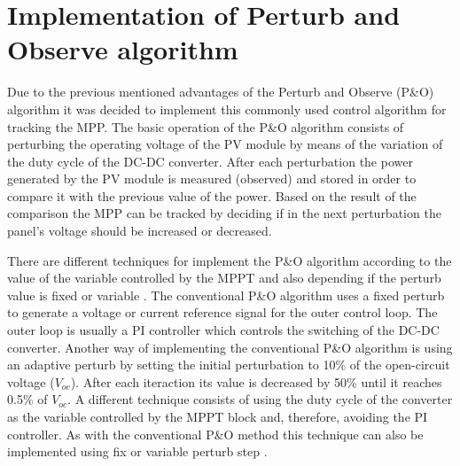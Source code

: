 \section{Implementation of Perturb and Observe algorithm}\label{MPPTImplementation}

Due to the previous mentioned advantages of the Perturb and Observe (P\&O) algorithm it was decided to implement this commonly used control algorithm for tracking the MPP. The basic operation of the P\&O algorithm consists of perturbing the operating voltage of the PV module by means of the variation of the duty cycle of the DC-DC converter. After each perturbation the power generated by the PV module is measured (observed) and stored in order to compare it with the previous value of the power. Based on the result of the comparison the MPP can be tracked by deciding if in the next perturbation the panel's voltage should be increased or decreased.

There are different techniques for implement the P\&O algorithm according to the value of the variable controlled by the MPPT and also depending if the perturb value is fixed or variable . The conventional P\&O algorithm uses a fixed perturb to generate a voltage or current reference signal for the outer control loop. The outer loop is usually a PI controller which controls the switching of the DC-DC converter. Another way of implementing the conventional P\&O algorithm is using an adaptive perturb by setting the initial perturbation to 10\% of the open-circuit voltage ($V_{oc}$). After each iteraction its value is decreased by 50\% until it reaches 0.5\%
of $V_{oc}$. A different technique consists of using the duty cycle of the converter as the variable controlled by the MPPT block and, therefore, avoiding the PI controller. As with the conventional P\&O method this technique can also be implemented using fix or variable perturb step . 


